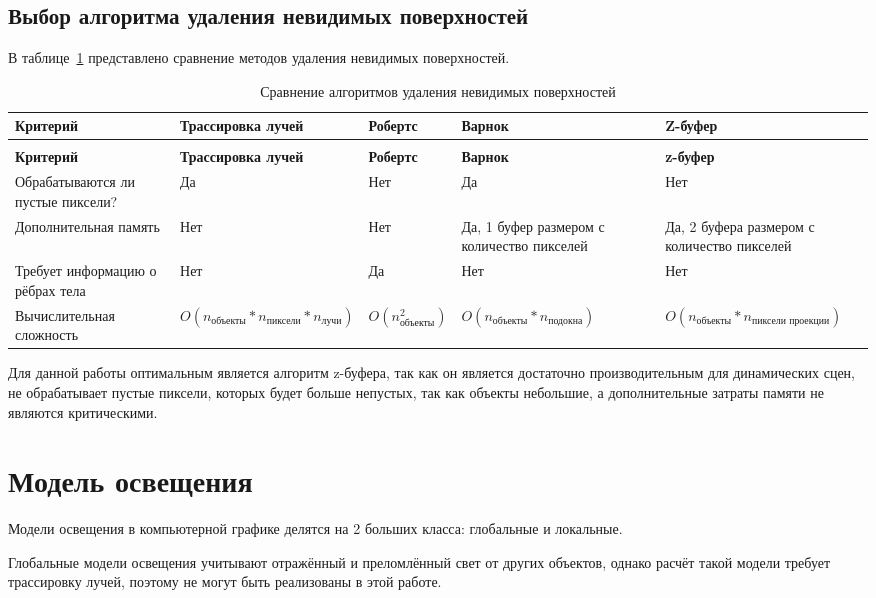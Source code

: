 \subsection*{Выбор алгоритма удаления невидимых поверхностей}

В таблице~\ref{tbl:invisible} представлено сравнение методов удаления невидимых поверхностей.

\begin{longtable}{|p{}|p{}|p{}|p{}|p{}|}
	\caption{Сравнение алгоритмов удаления невидимых поверхностей} \label{tbl:invisible} 
	\\
	\hline
	\textbf{Критерий} & \textbf{Трассировка лучей} & \textbf{Робертс} & \textbf{Варнок} & \textbf{Z-буфер} \\
	\hline
	\endfirsthead
	\caption{Сравнение алгоритмов удаления невидимых поверхностей}
	\\
	\hline
	\textbf{Критерий} & \textbf{Трассировка лучей} & \textbf{Робертс} & \textbf{Варнок} & \textbf{z-буфер} \\
	\hline
	\endhead
	\hline
	\endfoot
	\endlastfoot
	Обрабатываются ли пустые пиксели? & Да & Нет & Да & Нет \\
	\hline
	Дополнительная память & Нет & Нет & Да, 1 буфер размером с количество пикселей & Да, 2 буфера размером с количество пикселей \\
	\hline
	Требует информацию о рёбрах тела & Нет & Да & Нет & Нет \\
	\hline
	Вычислительная сложность & $O(n_{\text{объекты}}*n_{\text{пиксели}} * n_{\text{лучи}})$ & $O(n_{\text{объекты}}^2)$ & $O(n_{\text{объекты}}*n_{\text{подокна}})$ & $O(n_{\text{объекты}}*n_{\text{пиксели проекции}})$ \\
	\hline
\end{longtable}

Для данной работы оптимальным является алгоритм z-буфера, так как он является достаточно производительным для динамических сцен, не обрабатывает пустые пиксели, которых будет больше непустых, так как объекты небольшие, а дополнительные затраты памяти не являются критическими.

\section{Модель освещения}
Модели освещения в компьютерной графике делятся на 2 больших класса: глобальные и локальные.

Глобальные модели освещения учитывают отражённый и преломлённый свет от других объектов, однако расчёт такой модели требует трассировку лучей, поэтому не могут быть реализованы в этой работе.

